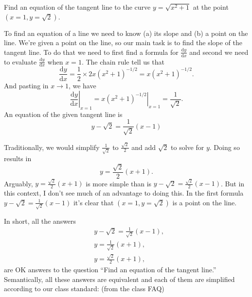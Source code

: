 \documentclass[12pt,fleqn,answers]{exam}
\begin{document}
\begin{questions}


\question Find an equation of the tangent line to the 
curve $y = \sqrt{x^2+1}$ at the point \mbox{$(x=1, y=\sqrt{2})$.}
\begin{solution}[2.5in]

To find an equation of a line we need to know (a) its slope and (b) a point on the
line.  We're given a point on the line, so our main task is to find the slope of the 
tangent line. To do that we need to first find a formula for \(\displaystyle
\frac{\mathrm{d} y}{\mathrm{d} x} \) and second we need to evaluate \(\displaystyle
\frac{\mathrm{d} y}{\mathrm{d} x} \) when $x=1$. The chain rule tell us that
\begin{equation}
    \frac{\mathrm{d} y}{\mathrm{d} x} = \frac{1}{2} \times 2 x (x^2+1)^{-1/2}
      = x (x^2+1)^{-1/2}.
\end{equation}
And pasting in $x \to 1$, we have
\begin{equation}
    \left . \frac{\mathrm{d} y}{\mathrm{d} x} \right |_{x=1}=  
    \left .  x (x^2+1)^{-1/2} \right |_{x=1} =
    \frac{1}{\sqrt{2}}.
\end{equation}
An equation of the given tangent line is
\begin{equation}
  y - \sqrt{2} = \frac{1}{\sqrt{2}} (x-1)
\end{equation}

Traditionally, we would simplify \(\frac{1}{\sqrt{2}}\)
to \(\frac{\sqrt{2}}{2}\) and add $\sqrt{2}$ to solve for $y$. Doing so results in
\begin{equation}
  y= \frac{\sqrt{2}}{2} (x+1).
\end{equation}
Arguably, $ y= \frac{\sqrt{2}}{2} (x+1)$ is more simple than is $y - \sqrt{2} = \frac{\sqrt{2}}{2} (x-1)$.
But in this context, I don't see much of an advantage to doing this. In the first formula $y - \sqrt{2} = \frac{1}{\sqrt{2}} (x-1)$
it's clear that $(x=1, y=\sqrt{2})$ is a point on the line.  

In short, all the answers
\begin{align*}
  &y - \sqrt{2} = \frac{1}{\sqrt{2}} (x-1),\\
  &y =  \frac{1}{\sqrt{2}} (x+1),\\
  &y =\frac{\sqrt{2}}{2} (x+1),
 \end{align*}
 are OK answers to the question ``Find an equation of the tangent line.'' Semantically, all these answers are equivalent and
 each of them are simplified according to our class standard: (from the class FAQ)
 

\end{solution}
\end{questions}
\end{document}
